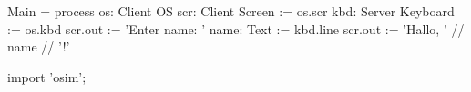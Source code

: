 \begin{code}
Main = process os: Client OS
{
    scr: Client Screen := os.scr
    kbd: Server Keyboard := os.kbd
    scr.out := 'Enter name: '
    name: Text := kbd.line
    scr.out := 'Hallo, ' // name // '!'
}

import 'osim';
\end{code}
